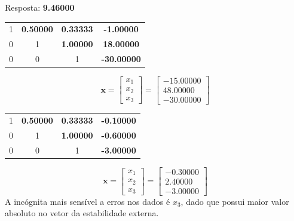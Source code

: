 \setcounter{chapter}{14}


Resposta: \textbf{9.46000}



\begin{center}
    \begin{tabular}{ c c c | c}
        1 & \textbf{0.50000} & \textbf{0.33333} & \textbf{-1.00000} \\
        0 & 1 & \textbf{1.00000} & \textbf{18.00000} \\
        0 & 0 & 1 & \textbf{-30.00000}
    \end{tabular}
\end{center}
\begin{equation*}
    \mathbf{x}
    =\begin{bmatrix} x_1 \\ x_2 \\ x_3 \end{bmatrix}
    =\begin{bmatrix} -15.00000 \\ 48.00000 \\ -30.00000 \end{bmatrix}
\end{equation*}
\begin{center}
    \begin{tabular}{ c c c | c}
        1 & \textbf{0.50000} & \textbf{0.33333} & \textbf{-0.10000} \\
        0 & 1 & \textbf{1.00000} & \textbf{-0.60000} \\
        0 & 0 & 1 & \textbf{-3.00000}
    \end{tabular}
\end{center}
\begin{equation*}
    \mathbf{x}
    =\begin{bmatrix} x_1 \\ x_2 \\ x_3 \end{bmatrix}
    =\begin{bmatrix} -0.30000 \\ 2.40000 \\ -3.00000 \end{bmatrix}
\end{equation*}
A incógnita mais sensível a erros nos dados é $x_3$, dado que possui maior valor absoluto no vetor da estabilidade externa.

